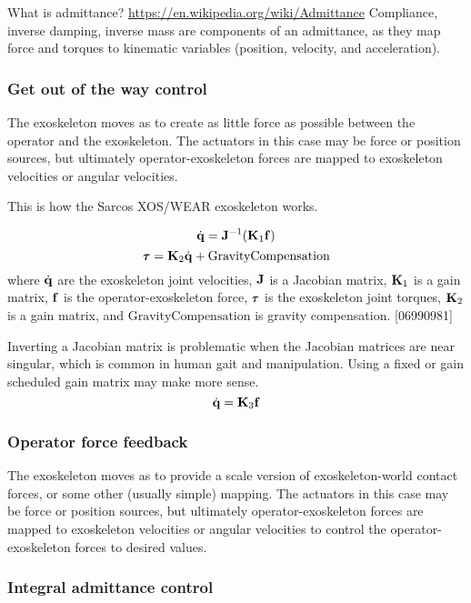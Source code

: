 \documentclass[letterpaper,12pt,fullpage]{article}
\newcommand{\gc}{{\mbox {GravityCompensation}}}
\begin{document}
What is admittance?
\url{https://en.wikipedia.org/wiki/Admittance}
Compliance, inverse damping, inverse mass are components of an admittance,
as they map force and torques to kinematic variables (position, velocity, and
acceleration). 

\subsubsection{Get out of the way control}

The exoskeleton moves as to create as little force as possible between the
operator and the exoskeleton. The actuators in this case may be force or
position sources, but ultimately operator-exoskeleton forces are mapped
to exoskeleton velocities or angular velocities.

This is how the Sarcos XOS/WEAR exoskeleton works.

\begin{equation}
\dot{{\bf q}} = {\bf J}^{-1} ({\bf K}_1 {\bf f})
\end{equation}
\begin{equation}
\vtau = \mK_2 \dot{\vq} + \gc
\end{equation}
where $\dot{{\bf q}}$ are the exoskeleton joint velocities,
${\bf J}$ is a Jacobian matrix, ${\bf K}_1$ is a gain matrix,
${\bf f}$ is the operator-exoskeleton force, 
$\vtau$ is the exoskeleton joint torques, ${\bf K}_2$ is a gain matrix,
and $\gc$ is gravity compensation.
[06990981]

Inverting a Jacobian matrix is problematic when the Jacobian matrices are
near singular, which is common in human gait and manipulation.
Using a fixed or gain scheduled gain matrix may make more sense.
\begin{equation}
\dot{{\bf q}} = {\bf K}_3 {\bf f}
\end{equation}

\subsubsection{Operator force feedback}

The exoskeleton moves as to provide a scale version of exoskeleton-world
contact forces, or some other (usually simple) mapping. 
The actuators in this case may be force or
position sources, but ultimately operator-exoskeleton forces are mapped
to exoskeleton velocities or angular velocities to control the
operator-exoskeleton forces to desired values.

\subsubsection{Integral admittance control}
\end{document}
